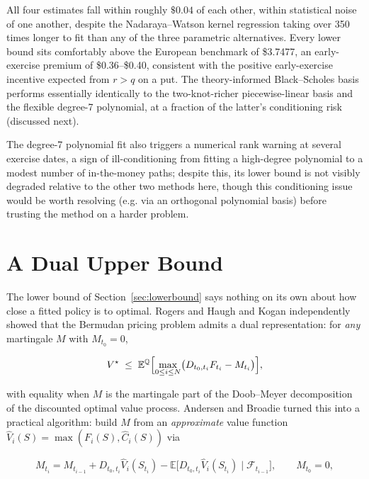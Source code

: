 \documentclass[11pt]{article}
\begin{document}
All four estimates fall within roughly $\$0.04$ of each other, within statistical noise of one another, despite the Nadaraya--Watson kernel regression taking over 350 times longer to fit than any of the three parametric alternatives. Every lower bound sits comfortably above the European benchmark of \$3.7477, an early-exercise premium of \$0.36--\$0.40, consistent with the positive early-exercise incentive expected from $r > q$ on a put. The theory-informed Black--Scholes basis performs essentially identically to the two-knot-richer piecewise-linear basis and the flexible degree-7 polynomial, at a fraction of the latter's conditioning risk (discussed next).

The degree-7 polynomial fit also triggers a numerical rank warning at several exercise dates, a sign of ill-conditioning from fitting a high-degree polynomial to a modest number of in-the-money paths; despite this, its lower bound is not visibly degraded relative to the other two methods here, though this conditioning issue would be worth resolving (e.g. via an orthogonal polynomial basis) before trusting the method on a harder problem.

\section{A Dual Upper Bound}
\label{sec:dual}

The lower bound of Section~\ref{sec:lowerbound} says nothing on its own about how close a fitted policy is to optimal. Rogers \cite{rogers2002} and Haugh and Kogan \cite{haughkogan2004} independently showed that the Bermudan pricing problem admits a dual representation: for \emph{any} martingale $M$ with $M_{t_0}=0$,

\begin{equation}
V^\star \;\le\; \mathbb E^{\mathbb Q}\Bigl[\max_{0\le i\le N} \bigl(D_{t_0,t_i} F_{t_i} - M_{t_i}\bigr)\Bigr],
\end{equation}

with equality when $M$ is the martingale part of the Doob--Meyer decomposition of the discounted optimal value process. Andersen and Broadie \cite{andersenbroadie2004} turned this into a practical algorithm: build $M$ from an \emph{approximate} value function $\widehat V_i(S) = \max(F_i(S), \widehat C_i(S))$ via

\begin{equation}
M_{t_i} = M_{t_{i-1}} + D_{t_0,t_i}\widehat V_i(S_{t_i}) - \mathbb E\bigl[D_{t_0,t_i}\widehat V_i(S_{t_i}) \mid \mathcal F_{t_{i-1}}\bigr], \qquad M_{t_0}=0,
\end{equation}
\end{document}
